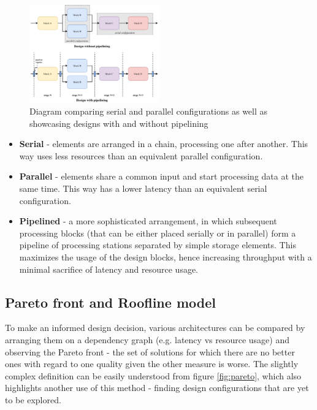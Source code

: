 \begin{figure}[hpt!]
  \centering
  \includegraphics[trim={0cm 0cm 0cm 0cm}, width=0.5\textwidth, center]{background/serial_parallel_pipelined.pdf}
  \caption{Diagram comparing serial and parallel configurations as well as showcasing designs with and without pipelining}
  \label{fig:serial-parallel-pipelined}
\end{figure}

\begin{itemize}
  \item \textbf{Serial} - elements are arranged in a chain, processing one after another. This way uses less resources than an equivalent parallel configuration.
  \item \textbf{Parallel} - elements share a common input and start processing data at the same time. This way has a lower latency than an equivalent serial configuration.
  \item \textbf{Pipelined} - a more sophisticated arrangement, in which subsequent processing blocks (that can be either placed serially or in parallel) form a pipeline of processing stations separated by simple storage elements. This maximizes the usage of the design blocks, hence increasing throughput with a minimal sacrifice of latency and resource usage.
\end{itemize}


\subsection{Pareto front and Roofline model}
To make an informed design decision, various architectures can be compared by arranging them on a dependency graph (e.g. latency vs resource usage) and observing the Pareto front - the set of solutions for which there are no better ones with regard to one quality given the other measure is worse. The slightly complex definition can be easily understood from figure \ref{fig:pareto}, which also highlights another use of this method - finding design configurations that are yet to be explored.

